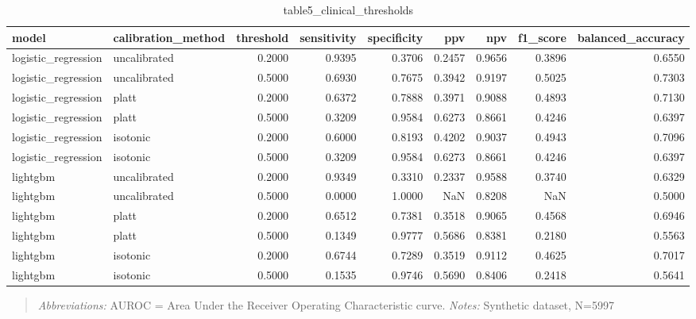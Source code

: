 \begin{table}[htbp]
\centering
\caption{table5_clinical_thresholds}
\label{table5_clinical_thresholds}
\begin{tabular}{llrrrrrrr}
\toprule
model & calibration\_method & threshold & sensitivity & specificity & ppv & npv & f1\_score & balanced\_accuracy \\
\midrule
logistic\_regression & uncalibrated & 0.2000 & 0.9395 & 0.3706 & 0.2457 & 0.9656 & 0.3896 & 0.6550 \\
logistic\_regression & uncalibrated & 0.5000 & 0.6930 & 0.7675 & 0.3942 & 0.9197 & 0.5025 & 0.7303 \\
logistic\_regression & platt & 0.2000 & 0.6372 & 0.7888 & 0.3971 & 0.9088 & 0.4893 & 0.7130 \\
logistic\_regression & platt & 0.5000 & 0.3209 & 0.9584 & 0.6273 & 0.8661 & 0.4246 & 0.6397 \\
logistic\_regression & isotonic & 0.2000 & 0.6000 & 0.8193 & 0.4202 & 0.9037 & 0.4943 & 0.7096 \\
logistic\_regression & isotonic & 0.5000 & 0.3209 & 0.9584 & 0.6273 & 0.8661 & 0.4246 & 0.6397 \\
lightgbm & uncalibrated & 0.2000 & 0.9349 & 0.3310 & 0.2337 & 0.9588 & 0.3740 & 0.6329 \\
lightgbm & uncalibrated & 0.5000 & 0.0000 & 1.0000 & NaN & 0.8208 & NaN & 0.5000 \\
lightgbm & platt & 0.2000 & 0.6512 & 0.7381 & 0.3518 & 0.9065 & 0.4568 & 0.6946 \\
lightgbm & platt & 0.5000 & 0.1349 & 0.9777 & 0.5686 & 0.8381 & 0.2180 & 0.5563 \\
lightgbm & isotonic & 0.2000 & 0.6744 & 0.7289 & 0.3519 & 0.9112 & 0.4625 & 0.7017 \\
lightgbm & isotonic & 0.5000 & 0.1535 & 0.9746 & 0.5690 & 0.8406 & 0.2418 & 0.5641 \\
\bottomrule
\end{tabular}

\end{table}


\begin{quote}\small
\textit{Abbreviations:} AUROC = Area Under the Receiver Operating Characteristic curve.
\textit{Notes:} Synthetic dataset, N=5997
\end{quote}